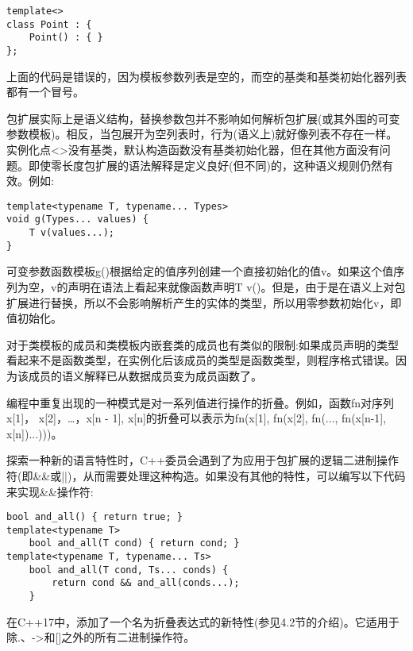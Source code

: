 \begin{lstlisting}[style=styleCXX]
template<>
class Point : {
	Point() : { }
};
\end{lstlisting}

上面的代码是错误的，因为模板参数列表是空的，而空的基类和基类初始化器列表都有一个冒号。

包扩展实际上是语义结构，替换参数包并不影响如何解析包扩展(或其外围的可变参数模板)。相反，当包展开为空列表时，行为(语义上)就好像列表不存在一样。实例化点<>没有基类，默认构造函数没有基类初始化器，但在其他方面没有问题。即使零长度包扩展的语法解释是定义良好(但不同)的，这种语义规则仍然有效。例如:

\begin{lstlisting}[style=styleCXX]
template<typename T, typename... Types>
void g(Types... values) {
	T v(values...);
}
\end{lstlisting}

可变参数函数模板g()根据给定的值序列创建一个直接初始化的值v。如果这个值序列为空，v的声明在语法上看起来就像函数声明T v()。但是，由于是在语义上对包扩展进行替换，所以不会影响解析产生的实体的类型，所以用零参数初始化v，即值初始化。

\begin{tcolorbox}[colback=webgreen!5!white,colframe=webgreen!75!black]
\hspace*{0.75cm}对于类模板的成员和类模板内嵌套类的成员也有类似的限制:如果成员声明的类型看起来不是函数类型，在实例化后该成员的类型是函数类型，则程序格式错误。因为该成员的语义解释已从数据成员变为成员函数了。
\end{tcolorbox}


编程中重复出现的一种模式是对一系列值进行操作的折叠。例如，函数fn对序列x[1]， x[2]，…，x[n - 1], x[n]的折叠可以表示为fn(x[1], fn(x[2], fn(..., fn(x[n-1], x[n])...)))。

探索一种新的语言特性时，C++委员会遇到了为应用于包扩展的逻辑二进制操作符(即\&\&或||)，从而需要处理这种构造。如果没有其他的特性，可以编写以下代码来实现\&\&操作符:

\begin{lstlisting}[style=styleCXX]
bool and_all() { return true; }
template<typename T>
	bool and_all(T cond) { return cond; }
template<typename T, typename... Ts>
	bool and_all(T cond, Ts... conds) {
		return cond && and_all(conds...);
	}
\end{lstlisting}

在C++17中，添加了一个名为折叠表达式的新特性(参见4.2节的介绍)。它适用于除.、->和[]之外的所有二进制操作符。


